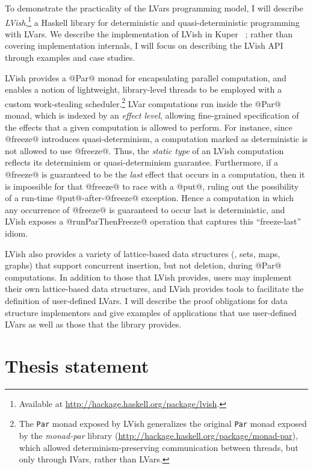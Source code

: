 \documentclass{article}
\begin{document}
To demonstrate the practicality of the LVars programming model, I will
describe \emph{LVish},\footnote{Available at
  \url{http://hackage.haskell.org/package/lvish}.} a Haskell library
for deterministic and quasi-deterministic programming with LVars.  We
describe the implementation of LVish in Kuper
\etal~\cite{Freeze-paper}; rather than covering implementation
internals, I will focus on describing the LVish API through examples
and case studies.

LVish provides a @Par@ monad for encapsulating parallel computation,
and enables a notion of lightweight, library-level threads to be
employed with a custom work-stealing scheduler.\footnote{The
  \lstinline|Par| monad exposed by LVish generalizes the original
  \lstinline|Par| monad exposed by the \emph{monad-par} library
  ({\scriptsize\url{http://hackage.haskell.org/package/monad-par}}),
  which allowed determinism-preserving communication between threads,
  but only through IVars, rather than LVars.}  LVar computations run
inside the @Par@ monad, which is indexed by an \emph{effect level},
allowing fine-grained specification of the effects that a given
computation is allowed to perform.  For instance, since @freeze@
introduces quasi-determinism, a computation marked as deterministic is
not allowed to use @freeze@.  Thus, the \emph{static type} of an LVish
computation reflects its determinism or quasi-determinism guarantee.
Furthermore, if a @freeze@ is guaranteed to be the \emph{last} effect
that occurs in a computation, then it is impossible for that @freeze@
to race with a @put@, ruling out the possibility of a run-time
@put@-after-@freeze@ exception.  Hence a computation in which any
occurrence of @freeze@ is guaranteed to occur last is deterministic,
and LVish exposes a @runParThenFreeze@ operation that captures this
``freeze-last'' idiom.

LVish also provides a variety of lattice-based data structures (\eg,
sets, maps, graphs) that support concurrent insertion, but not
deletion, during @Par@ computations.  In addition to those that LVish
provides, users may implement their own lattice-based data structures,
and LVish provides tools to facilitate the definition of user-defined
LVars.  I will describe the proof obligations for data structure
implementors and give examples of applications that use user-defined
LVars as well as those that the library provides.


\section{Thesis statement}\label{s:thesis}
\end{document}

